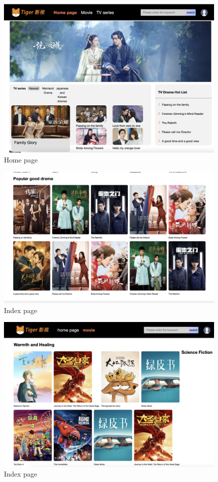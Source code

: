 \documentclass[a4paper, 11pt]{report}
\begin{document}
\begin{figure}
\includegraphics[width=1\linewidth]{hp2.png}
\caption{\label{hp2.png}Home page}
\end{figure}

\begin{figure}
\includegraphics[width=1\linewidth]{index1.png}
\caption{\label{index1.png}Index page}
\end{figure}

\begin{figure}
\includegraphics[width=1\linewidth]{index2.png}
\caption{\label{index2.png}Index page}
\end{figure}
\end{document}
